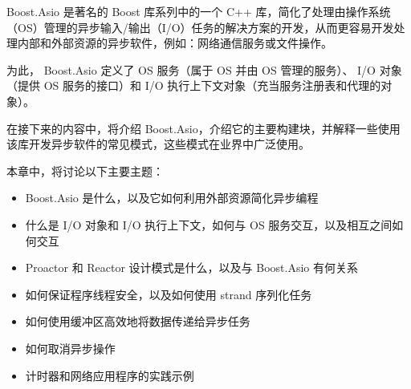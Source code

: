 Boost.Asio 是著名的 Boost 库系列中的一个 C++ 库，简化了处理由操作系统（OS）管理的异步输入/输出（I/O）任务的解决方案的开发，从而更容易开发处理内部和外部资源的异步软件，例如：网络通信服务或文件操作。

为此， Boost.Asio 定义了 OS 服务（属于 OS 并由 OS 管理的服务）、 I/O 对象（提供 OS 服务的接口）和 I/O 执行上下文对象（充当服务注册表和代理的对象）。

在接下来的内容中，将介绍 Boost.Asio，介绍它的主要构建块，并解释一些使用该库开发异步软件的常见模式，这些模式在业界中广泛使用。

本章中，将讨论以下主要主题：

\begin{itemize}
\item
Boost.Asio 是什么，以及它如何利用外部资源简化异步编程

\item
什么是 I/O 对象和 I/O 执行上下文，如何与 OS 服务交互，以及相互之间如何交互

\item
Proactor 和 Reactor 设计模式是什么，以及与 Boost.Asio 有何关系

\item
如何保证程序线程安全，以及如何使用 strand 序列化任务

\item
如何使用缓冲区高效地将数据传递给异步任务

\item
如何取消异步操作

\item
计时器和网络应用程序的实践示例
\end{itemize}